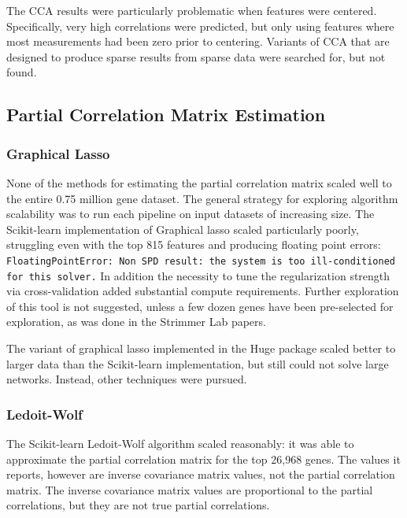 The CCA results were particularly problematic when features were centered.
Specifically, very high correlations were predicted, but only using features where most measurements had been zero prior to centering.
Variants of CCA that are designed to produce sparse results from sparse data were searched for, but not found.

\subsection{Partial Correlation Matrix Estimation}

\subsubsection{Graphical Lasso}
None of the methods for estimating the partial correlation matrix scaled well to the entire 0.75 million gene dataset.
The general strategy for exploring algorithm scalability was to run each pipeline on input datasets of increasing size.
The Scikit-learn implementation of Graphical lasso scaled particularly poorly, struggling even with the top 815 features and producing floating point errors:
\texttt{FloatingPointError: Non SPD result: the system is too ill-conditioned for this solver.} %
In addition the necessity to tune the regularization strength via cross-validation added substantial compute requirements.
Further exploration of this tool is not suggested, unless a few dozen genes have been pre-selected for exploration, as was done in the Strimmer Lab papers.

The variant of graphical lasso implemented in the Huge package scaled better to larger data than the Scikit-learn implementation, but still could not solve large networks.
Instead, other techniques were pursued.

\subsubsection{Ledoit-Wolf}
The Scikit-learn Ledoit-Wolf algorithm scaled reasonably: it was able to approximate the partial correlation matrix for the top 26,968 genes.
The values it reports, however are inverse covariance matrix values, not the partial correlation matrix.
The inverse covariance matrix values are proportional to the partial correlations, but they are not true partial correlations.

